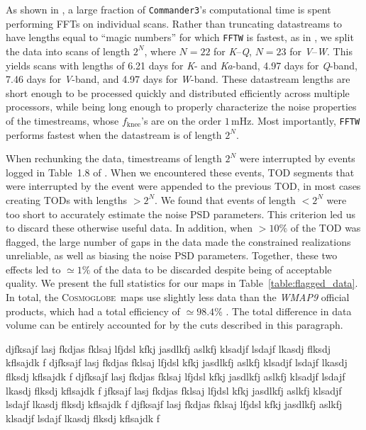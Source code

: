 \documentclass[twocolumn]{../../common/aa}
\def\commanderthree{\texttt{Commander3}}
\newcommand{\Cosmoglobe}{\textsc{Cosmoglobe}}
\newcommand{\K}[0]{\textit K}
\newcommand{\Ka}[0]{\textit{Ka}}
\newcommand{\Q}[0]{\textit Q}
\newcommand{\V}[0]{\textit V}
\newcommand{\W}[0]{\textit W}
\begin{document}
As shown in \citet{bp03}, a large fraction of \commanderthree's computational time is spent performing FFTs on individual scans. Rather than truncating datastreams to have lengths equal to ``magic numbers'' for which \texttt{FFTW} \citep{FFTW05} is fastest, as in \citet{bp03}, 
we split the data into scans of length $2^N$, where $N=22$ for \K--\Q, $N=23$ for \V--\W. This yields scans with lengths of 6.21 days for \K- and \Ka-band, 4.97 days for \Q-band, 7.46 days for \V-band, and 4.97 days for \W-band.
These datastream lengths are short enough to be processed quickly and distributed efficiently across multiple processors, while being long enough to properly characterize the noise properties of the timestreams, whose $f_\mathrm{knee}$'s are on the order $1\,\mathrm{mHz}$. Most importantly, \texttt{FFTW} performs fastest when the datastream is of length $2^N$.

When rechunking the data, timestreams of length $2^N$ were interrupted by events logged in Table~1.8 of \citet{wmapexsupp}.
When we encountered these events, TOD segments that were interrupted by the event were appended to the previous TOD, in most cases creating TODs with lengths $>2^N$. We found that events of length $<2^N$ were too short to accurately estimate the noise PSD parameters. This criterion led us to discard these otherwise useful data. In addition, when $>10\%$ of the TOD was flagged, the large number of gaps in the data made the constrained realizations unreliable, as well as biasing the noise PSD parameters. Together, these two effects led to $\simeq1\%$ of the data to be discarded despite being of acceptable quality. We present the full statistics for our maps in Table~\ref{table:flagged_data}. In total, the \Cosmoglobe\ maps use slightly less data than the \textit{WMAP9} official products, which had a total efficiency of $\simeq98.4\%$ \citep{bennett2012}. The total difference in data volume can be entirely accounted for by the cuts described in this paragraph.




djfksajf lasj fkdjas fklsaj lfjdsl kfkj jasdlkfj aslkfj klsadjf lsdajf lkasdj flksdj kflsajdk f
djfksajf lasj fkdjas fklsaj lfjdsl kfkj jasdlkfj aslkfj klsadjf lsdajf lkasdj flksdj kflsajdk f
djfksajf lasj fkdjas fklsaj lfjdsl kfkj jasdlkfj aslkfj klsadjf lsdajf lkasdj flksdj kflsajdk f
jfksajf lasj fkdjas fklsaj lfjdsl kfkj jasdlkfj aslkfj klsadjf lsdajf lkasdj flksdj kflsajdk f
djfksajf lasj fkdjas fklsaj lfjdsl kfkj jasdlkfj aslkfj klsadjf lsdajf lkasdj flksdj kflsajdk f
\end{document}
